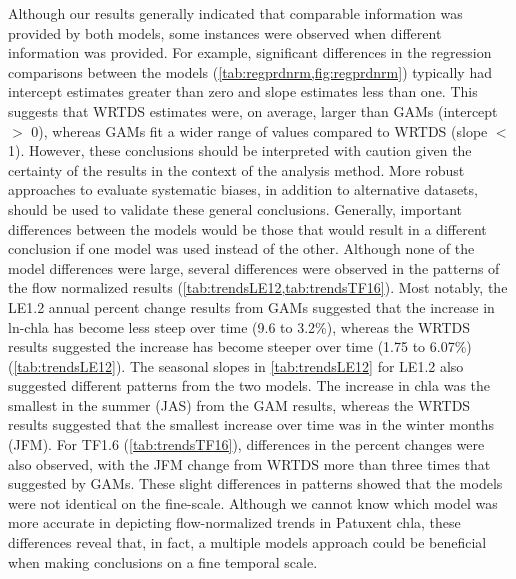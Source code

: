 \documentclass{svjour3}\usepackage[]{graphicx}\usepackage[]{color}
\begin{document}
Although our results generally indicated that comparable information was provided by both models, some instances were observed when different information was provided.  For example, significant differences in the regression comparisons between the models (\cref{tab:regprdnrm,fig:regprdnrm}) typically had intercept estimates greater than zero and slope estimates less than one.  This suggests that \ac{WRTDS} estimates were, on average, larger than \acp{GAM} (intercept $>$ 0), whereas \acp{GAM} fit a wider range of values compared to \ac{WRTDS} (slope $<$ 1). However, these conclusions should be interpreted with caution given the certainty of the results in the context of the analysis method. More robust approaches to evaluate systematic biases, in addition to alternative datasets, should be used to validate these general conclusions.  Generally, important differences between the models would be those that would result in a different conclusion if one model was used instead of the other. Although none of the model differences were large, several differences were observed in the patterns of the flow normalized results (\cref{tab:trendsLE12,tab:trendsTF16}). Most notably, the LE1.2 annual percent change results from \acp{GAM} suggested that the increase in ln-\ac{chla} has become less steep over time (9.6 to 3.2\%), whereas the \ac{WRTDS} results suggested the increase has become steeper over time (1.75 to 6.07\%) (\cref{tab:trendsLE12}). The seasonal slopes in \cref{tab:trendsLE12} for LE1.2 also suggested different patterns from the two models. The increase in \ac{chla} was the smallest in the summer (\ac{JAS}) from the \ac{GAM} results, whereas the \ac{WRTDS} results suggested that the smallest increase over time was in the winter months (\ac{JFM}). For TF1.6 (\cref{tab:trendsTF16}), differences in the percent changes were also observed, with the \ac{JFM} change from \ac{WRTDS} more than three times that suggested by \acp{GAM}. These slight differences in patterns showed that the models were not identical on the fine-scale. Although we cannot know which model was more accurate in depicting flow-normalized trends in Patuxent \ac{chla}, these differences reveal that, in fact, a multiple models approach could be beneficial when making conclusions on a fine temporal scale.
\end{document}
